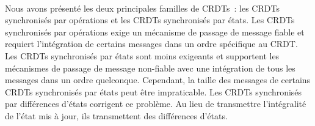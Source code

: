 \paragraph{} Nous avons présenté les deux principales familles de \acp{CRDT}~: les \acp{CRDT} synchronisés par opérations et les \acp{CRDT} synchronisés par états.
Les \acp{CRDT} synchronisés par opérations exige un mécanisme de passage de message fiable et requiert l'intégration de certains messages dans un ordre spécifique au \ac{CRDT}.
Les \acp{CRDT} synchronisés par états sont moins exigeants et supportent les mécanismes de passage de message non-fiable avec une intégration de tous les messages dans un ordre quelconque.
Cependant, la taille des messages de certains \acp{CRDT} synchronisés par états peut être impraticable.
Les \acp{CRDT} synchronisés par différences d'états corrigent ce problème.
Au lieu de transmettre l'intégralité de l'état mis à jour, ils transmettent des différences d'états.
